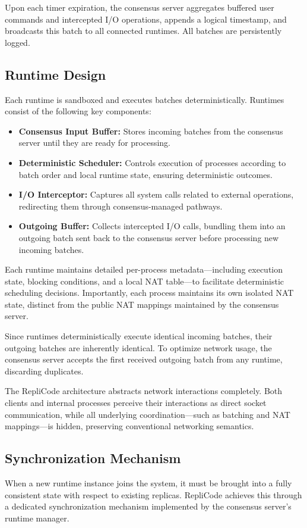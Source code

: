 \documentclass[10pt, 
]{IEEEtran}
\begin{document}
Upon each timer expiration, the consensus server aggregates buffered user commands and intercepted I/O operations, appends a logical timestamp, and broadcasts this batch to all connected runtimes. All batches are persistently logged.

\subsection{Runtime Design}

Each runtime is sandboxed and executes batches deterministically. Runtimes consist of the following key components:

\begin{itemize}
\item \textbf{Consensus Input Buffer:} Stores incoming batches from the consensus server until they are ready for processing.
\item \textbf{Deterministic Scheduler:} Controls execution of processes according to batch order and local runtime state, ensuring deterministic outcomes.
\item \textbf{I/O Interceptor:} Captures all system calls related to external operations, redirecting them through consensus-managed pathways.
\item \textbf{Outgoing Buffer:} Collects intercepted I/O calls, bundling them into an outgoing batch sent back to the consensus server before processing new incoming batches.
\end{itemize}

Each runtime maintains detailed per-process metadata—including execution state, blocking conditions, and a local NAT table—to facilitate deterministic scheduling decisions. Importantly, each process maintains its own isolated NAT state, distinct from the public NAT mappings maintained by the consensus server.

Since runtimes deterministically execute identical incoming batches, their outgoing batches are inherently identical. To optimize network usage, the consensus server accepts the first received outgoing batch from any runtime, discarding duplicates.

The RepliCode architecture abstracts network interactions completely. Both clients and internal processes perceive their interactions as direct socket communication, while all underlying coordination—such as batching and NAT mappings—is hidden, preserving conventional networking semantics.

\subsection{Synchronization Mechanism}
When a new runtime instance joins the system, it must be brought into a fully consistent state with respect to existing replicas. RepliCode achieves this through a dedicated synchronization mechanism implemented by the consensus server’s runtime manager.
\end{document}
